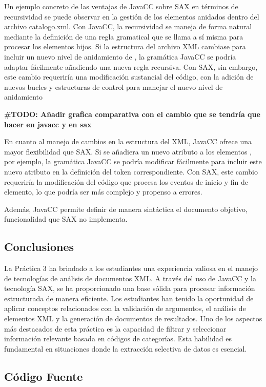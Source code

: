 Un ejemplo concreto de las ventajas de JavaCC sobre SAX en términos de recursividad se puede observar en la gestión de los elementos anidados dentro del archivo catalogo.xml. Con JavaCC, la recursividad se maneja de forma natural mediante la definición de una regla gramatical que se llama a sí misma para procesar los elementos hijos. Si la estructura del archivo XML cambiase para incluir un nuevo nivel de anidamiento de , la gramática JavaCC se podría adaptar fácilmente añadiendo una nueva regla recursiva. Con SAX, sin embargo, este cambio requeriría una modificación sustancial del código, con la adición de nuevos bucles y estructuras de control para manejar el nuevo nivel de anidamiento

\textbf{\#TODO: Añadir grafica comparativa con el cambio que se tendría que hacer en javacc y en sax}

En cuanto al manejo de cambios en la estructura del XML, JavaCC ofrece una mayor flexibilidad que SAX. Si se añadiera un nuevo atributo a los elementos , por ejemplo, la gramática JavaCC se podría modificar fácilmente para incluir este nuevo atributo en la definición del token correspondiente. Con SAX, este cambio requeriría la modificación del código que procesa los eventos de inicio y fin de elemento, lo que podría ser más complejo y propenso a errores.

Además, JavaCC permite definir de manera sintáctica el documento objetivo, funcionalidad que SAX no implementa.

\subsection{Conclusiones}

\noindent La Práctica 3 ha brindado a los estudiantes una experiencia valiosa en el manejo de tecnologías de análisis de documentos XML. A través del uso de JavaCC y la tecnología SAX, se ha proporcionado una base sólida para procesar información estructurada de manera eficiente. Los estudiantes han tenido la oportunidad de aplicar conceptos relacionados con la validación de argumentos, el análisis de elementos XML y la generación de documentos de resultados.
Uno de los aspectos más destacados de esta práctica es la capacidad de filtrar y seleccionar información relevante basada en códigos de categorías. Esta habilidad es fundamental en situaciones donde la extracción selectiva de datos es esencial.


\subsection{Código Fuente}

